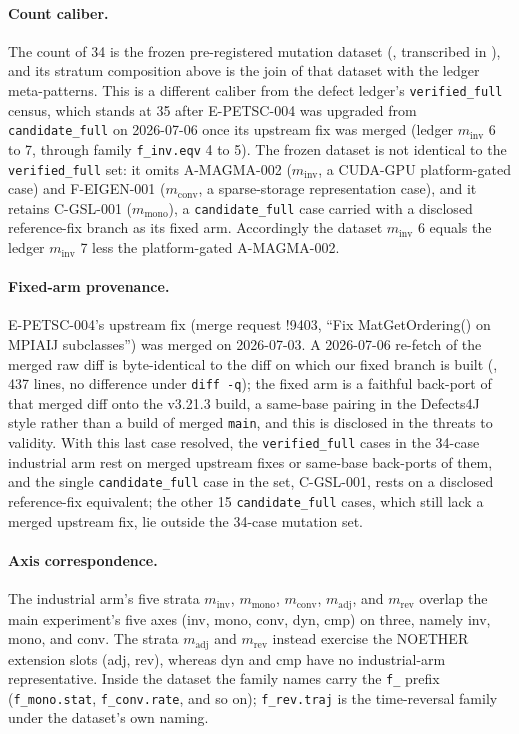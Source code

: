 \documentclass[manuscript,screen,review]{acmart}
\begin{document}
\paragraph{Count caliber.} The count of 34 is the frozen pre-registered
mutation dataset (, transcribed in
), and its stratum composition
above is the join of that dataset with the ledger meta-patterns. This is
a different caliber from the defect ledger's \texttt{verified\_full}
census, which stands at 35 after E-PETSC-004 was upgraded from
\texttt{candidate\_full} on 2026-07-06 once its upstream fix was merged
(ledger \(m_{\mathrm{inv}}\) 6 to 7, through family \texttt{f\_inv.eqv} 4
to 5). The frozen dataset is not identical to the \texttt{verified\_full}
set: it omits A-MAGMA-002 (\(m_{\mathrm{inv}}\), a CUDA-GPU
platform-gated case) and F-EIGEN-001 (\(m_{\mathrm{conv}}\), a
sparse-storage representation case), and it retains C-GSL-001
(\(m_{\mathrm{mono}}\)), a \texttt{candidate\_full} case carried with a
disclosed reference-fix branch as its fixed arm. Accordingly the dataset
\(m_{\mathrm{inv}}\) 6 equals the ledger \(m_{\mathrm{inv}}\) 7 less the
platform-gated A-MAGMA-002.

\paragraph{Fixed-arm provenance.} E-PETSC-004's upstream fix (merge
request !9403, ``Fix MatGetOrdering() on MPIAIJ subclasses'') was merged
on 2026-07-03. A 2026-07-06 re-fetch of the merged raw diff is
byte-identical to the diff on which our fixed branch is built
(, 437 lines, no
difference under \texttt{diff -q}); the fixed arm is a faithful back-port
of that merged diff onto the v3.21.3 build, a same-base pairing in the
Defects4J style rather than a build of merged \texttt{main}, and this is
disclosed in the threats to validity. With this last case resolved, the
\texttt{verified\_full} cases in the 34-case industrial arm rest on
merged upstream fixes or same-base back-ports of them, and the single
\texttt{candidate\_full} case in the set, C-GSL-001, rests on a disclosed
reference-fix equivalent; the other 15 \texttt{candidate\_full} cases,
which still lack a merged upstream fix, lie outside the 34-case mutation
set.

\paragraph{Axis correspondence.} The industrial arm's five strata
\(m_{\mathrm{inv}}\), \(m_{\mathrm{mono}}\), \(m_{\mathrm{conv}}\),
\(m_{\mathrm{adj}}\), and \(m_{\mathrm{rev}}\) overlap the main
experiment's five axes (inv, mono, conv, dyn, cmp) on three, namely inv,
mono, and conv. The strata \(m_{\mathrm{adj}}\) and \(m_{\mathrm{rev}}\)
instead exercise the NOETHER extension slots (adj, rev), whereas dyn and
cmp have no industrial-arm representative. Inside the dataset the family
names carry the \texttt{f\_} prefix (\texttt{f\_mono.stat},
\texttt{f\_conv.rate}, and so on); \texttt{f\_rev.traj} is the
time-reversal family under the dataset's own naming.



\end{document}
